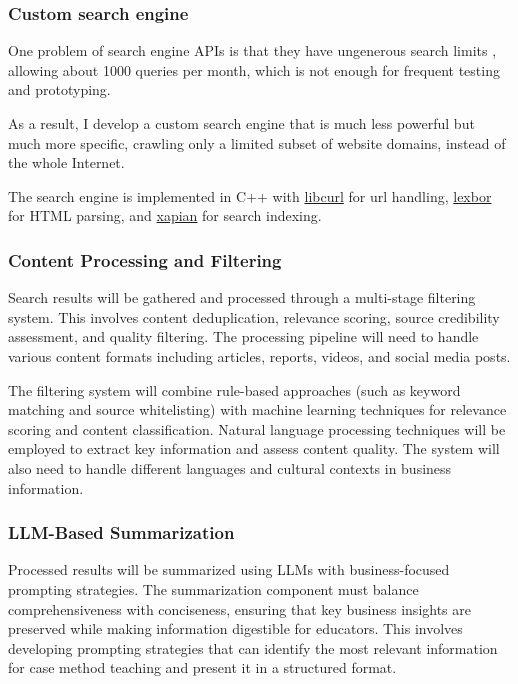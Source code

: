 \documentclass[final-report]{report-template}
\begin{document}
\subsubsection{Custom search engine} 
One problem of search engine APIs is that they have ungenerous search limits
\cite{search.api.limit.1}, allowing about 1000 queries per month, which is not
enough for frequent testing and prototyping.

As a result, I develop a custom search engine that is much less powerful but
much more specific, crawling only a limited subset of website domains, instead
of the whole Internet.

The search engine is implemented in C++ with
\href{https://curl.se/libcurl/}{\ttfamily libcurl} for url handling,
\href{https://lexbor.com/}{\ttfamily lexbor} for HTML parsing, and
\href{https://xapian.org/docs/}{\ttfamily xapian} for search indexing.


\subsubsection{Content Processing and Filtering} Search results will be
gathered and processed through a multi-stage filtering system. This involves
content deduplication, relevance scoring, source credibility assessment, and
quality filtering. The processing pipeline will need to handle various content
formats including articles, reports, videos, and social media posts.

The filtering system will combine rule-based approaches (such as keyword
matching and source whitelisting) with machine learning techniques for
relevance scoring and content classification. Natural language processing
techniques will be employed to extract key information and assess content
quality. The system will also need to handle different languages and cultural
contexts in business information.

\subsubsection{LLM-Based Summarization} Processed results will be summarized
using LLMs with business-focused prompting strategies. The summarization
component must balance comprehensiveness with conciseness, ensuring that key
business insights are preserved while making information digestible for
educators. This involves developing prompting strategies that can identify the
most relevant information for case method teaching and present it in a
structured format.
\end{document}

